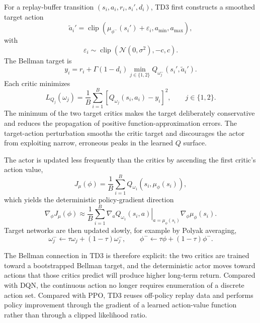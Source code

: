 \documentclass[11pt]{article}
\begin{document}
For a replay-buffer transition $(s_i,a_i,r_i,s_i',d_i)$, TD3 first constructs a smoothed target action
\begin{equation}
\widetilde{a}_i'
=
\operatorname{clip}\!\left(
\mu_{\phi^-}(s_i')+\varepsilon_i,
 a_{\min},a_{\max}
\right),
\label{eq:td3_target_action}
\end{equation}
with
\begin{equation}
\varepsilon_i
\sim
\operatorname{clip}\!\left(
\mathcal{N}(0,\sigma^2),-c,c
\right).
\label{eq:td3_target_noise}
\end{equation}
The Bellman target is
\begin{equation}
y_i
=
r_i
+\Gamma(1-d_i)
\min_{j\in\{1,2\}}
Q_{\omega_j^-}(s_i',\widetilde{a}_i').
\label{eq:td3_target}
\end{equation}
Each critic minimizes
\begin{equation}
L_{Q_j}(\omega_j)
=
\frac{1}{B}\sum_{i=1}^{B}
\left[Q_{\omega_j}(s_i,a_i)-y_i\right]^2,
\qquad j\in\{1,2\}.
\label{eq:td3_critic_loss}
\end{equation}
The minimum of the two target critics makes the target deliberately conservative and reduces the propagation of positive function-approximation errors. The target-action perturbation smooths the critic target and discourages the actor from exploiting narrow, erroneous peaks in the learned $Q$ surface.

The actor is updated less frequently than the critics by ascending the first critic's action value,
\begin{equation}
J_{\mu}(\phi)
=
\frac{1}{B}\sum_{i=1}^{B}
Q_{\omega_1}\!\left(s_i,\mu_{\phi}(s_i)\right),
\label{eq:td3_actor_objective}
\end{equation}
which yields the deterministic policy-gradient direction
\begin{equation}
\nabla_{\phi}J_{\mu}(\phi)
\approx
\frac{1}{B}\sum_{i=1}^{B}
\left.
\nabla_a Q_{\omega_1}(s_i,a)
\right|_{a=\mu_{\phi}(s_i)}
\nabla_{\phi}\mu_{\phi}(s_i).
\label{eq:td3_actor_gradient}
\end{equation}
Target networks are then updated slowly, for example by Polyak averaging,
\begin{equation}
\omega_j^-\leftarrow\tau\omega_j+(1-\tau)\omega_j^- ,
\qquad
\phi^-\leftarrow\tau\phi+(1-\tau)\phi^- .
\label{eq:td3_polyak}
\end{equation}

The Bellman connection in TD3 is therefore explicit: the two critics are trained toward a bootstrapped Bellman target, and the deterministic actor moves toward actions that those critics predict will produce higher long-term return. Compared with DQN, the continuous action no longer requires enumeration of a discrete action set. Compared with PPO, TD3 reuses off-policy replay data and performs policy improvement through the gradient of a learned action-value function rather than through a clipped likelihood ratio.
\end{document}
